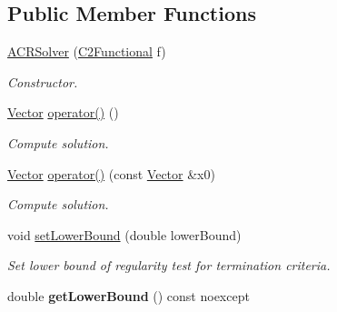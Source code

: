 \subsection*{Public Member Functions}
\begin{DoxyCompactItemize}
\item 
\hyperlink{classSpacy_1_1ACR_1_1ACRSolver_a18c168d468c1ad237e246805fa1ba1a4}{A\+C\+R\+Solver} (\hyperlink{classSpacy_1_1C2Functional}{C2\+Functional} f)
\begin{DoxyCompactList}\small\item\em Constructor. \end{DoxyCompactList}\item 
\hyperlink{classSpacy_1_1Vector}{Vector} \hyperlink{classSpacy_1_1ACR_1_1ACRSolver_ae68748adce75b5762ac7005024e29974}{operator()} ()\hypertarget{classSpacy_1_1ACR_1_1ACRSolver_ae68748adce75b5762ac7005024e29974}{}\label{classSpacy_1_1ACR_1_1ACRSolver_ae68748adce75b5762ac7005024e29974}

\begin{DoxyCompactList}\small\item\em Compute solution. \end{DoxyCompactList}\item 
\hyperlink{classSpacy_1_1Vector}{Vector} \hyperlink{classSpacy_1_1ACR_1_1ACRSolver_ac7bc2ff6568728c4bd79f49f3596d2bc}{operator()} (const \hyperlink{classSpacy_1_1Vector}{Vector} \&x0)
\begin{DoxyCompactList}\small\item\em Compute solution. \end{DoxyCompactList}\item 
void \hyperlink{classSpacy_1_1Mixin_1_1RegularityTest_a29ae1c15b8447601c2a783352e01bde2}{set\+Lower\+Bound} (double lower\+Bound)\hypertarget{classSpacy_1_1Mixin_1_1RegularityTest_a29ae1c15b8447601c2a783352e01bde2}{}\label{classSpacy_1_1Mixin_1_1RegularityTest_a29ae1c15b8447601c2a783352e01bde2}

\begin{DoxyCompactList}\small\item\em Set lower bound of regularity test for termination criteria. \end{DoxyCompactList}\item 
double {\bfseries get\+Lower\+Bound} () const noexcept\hypertarget{classSpacy_1_1Mixin_1_1RegularityTest_abc194f9b2150b6f02622867f673df4df}{}\label{classSpacy_1_1Mixin_1_1RegularityTest_abc194f9b2150b6f02622867f673df4df}


\end{DoxyCompactItemize}
